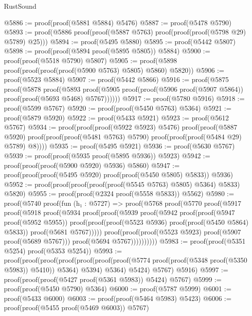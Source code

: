 \begin{lexlean}{RustSound}
\begin{coremodule}
@5886 := proof(proof(@5881 @5884) @5476)
@5887 := proof(@5478 @5790)
@5893 := proof(@5886 proof(proof(@5887 @5763) proof(proof(proof(@5798 @29) @5789) @25)))
@5894 := proof(@5495 @5880)
@5895 := proof(@5442 @5807)
@5898 := proof(proof(@5894 proof(@5895 @5805)) @5884)
@5900 := proof(proof(@5518 @5790) @5807)
@5905 := proof(@5898 proof(proof(proof(proof(@5900 @5763) @5805) @5860) @5820))
@5906 := proof(@5523 @5884)
@5907 := proof(@5442 @5866)
@5916 := proof(@5875
      proof(@5878
          proof(@5893
              proof(@5905 proof(proof(@5906 proof(@5907 @5864)) proof(proof(@5693 @5468) @5767))))))
@5917 := proof(@5780 @5916)
@5918 := proof(@5599 @5767)
@5920 := proof(proof(@5450 @5763) @5364)
@5921 := proof(@5879 @5920)
@5922 := proof(@5433 @5921)
@5923 := proof(@5612 @5767)
@5934 := proof(proof(proof(@5922 @5923) @5476)
      proof(proof(@5887 @5920)
          proof(proof(proof(@5481 @5763) @5790) proof(proof(proof(@5484 @29) @5789) @8))))
@5935 := proof(@5495 @5921)
@5936 := proof(@5630 @5767)
@5939 := proof(proof(@5935 proof(@5895 @5936)) @5923)
@5942 := proof(proof(proof(@5900 @5920) @5936) @5860)
@5947 := proof(proof(proof(@5495 @5920) proof(proof(@5450 @5805) @5833)) @5936)
@5952 := proof(proof(proof(proof(proof(@5545 @5763) @5805) @5364) @5833) @5820)
@5955 := proof(proof(@2324 proof(@5558 @5833)) @5562)
@5980 := proof(@5740
      proof(fun (h₁ : @5727) =>
        proof(@5768
            proof(@5770
                proof(@5917
                    proof(@5918
                        proof(@5934
                            proof(proof(@5939
                                  proof(@5942
                                      proof(proof(@5947 proof(@5952 @5955))
                                          proof(proof(proof(@5523 @5936)
                                                proof(proof(@5450 @5864) @5833))
                                              proof(@5681 @5767)))))
                                proof(proof(proof(@5523 @5923) proof(@5907 proof(@5689 @5767)))
                                    proof(@5694 @5767))))))))))
@5983 := proof(proof(@5351 @5254) proof(@5353 @5254))
@5993 := proof(proof(proof(proof(proof(proof(proof(@5774
                  proof(proof(@5348 proof(@5350 @5983)) @5410))
                @5364)
              @5394)
            @5364)
          @5424)
        @5767)
      @5916)
@5997 := proof(proof(proof(@5427 proof(@5361 @5983)) @5424) @5767)
@5999 := proof(proof(@5450 @5790) @5364)
@6000 := proof(@5787 @5999)
@6001 := proof(@5433 @6000)
@6003 := proof(proof(@5464 @5983) @5423)
@6006 := proof(proof(@5455 proof(@5469 @6003)) @5767)

\end{coremodule}
\end{lexlean}
